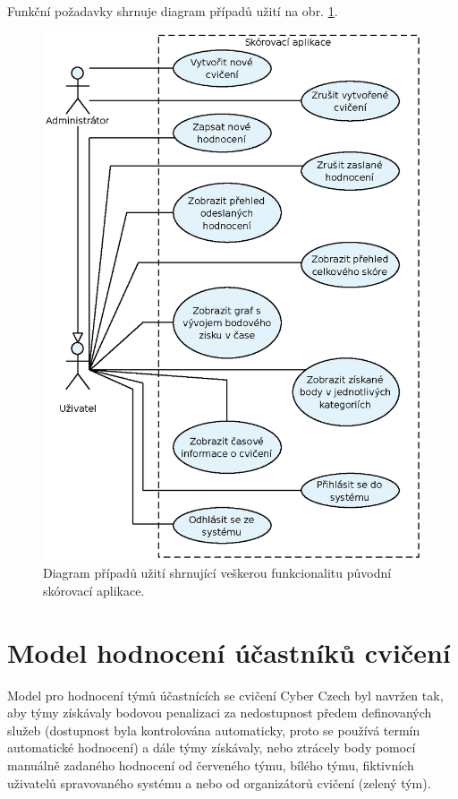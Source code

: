 \documentclass[
  digital, %
  twoside, %
  table,   %
  lof,     %
  lot,     %
]{fithesis3}
\begin{document}
Funkční požadavky shrnuje diagram případů užití na obr. \ref{fig:useCase1}.

\begin{figure}
    \centering
    \includegraphics[width=13cm]{images/Use-case-1.eps}
    \caption{Diagram případů užití shrnující veškerou funkcionalitu původní skórovací aplikace.}
    \label{fig:useCase1}
\end{figure}

\section{Model hodnocení účastníků cvičení}
Model pro hodnocení týmů účastnících se cvičení Cyber Czech byl navržen tak, aby týmy získávaly bodovou penalizaci za nedostupnost předem definovaných služeb (dostupnost byla kontrolována automaticky, proto se používá termín automatické hodnocení) a dále týmy získávaly, nebo ztrácely body pomocí manuálně zadaného hodnocení od červeného týmu, bílého týmu, fiktivních uživatelů spravovaného systému a nebo od organizátorů cvičení (zelený tým).
\end{document}
